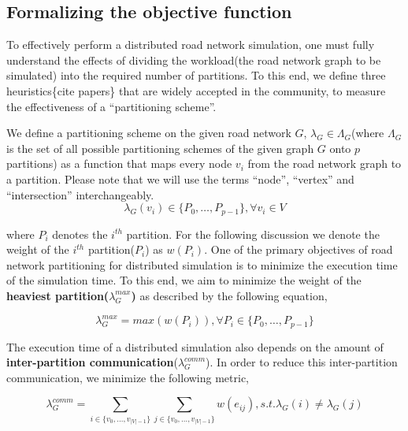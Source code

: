 \subsection{Formalizing the objective function}
\label{sec:form-obje-func}

To effectively perform a distributed road network simulation, one must fully understand the effects of dividing the workload(the road network graph to be simulated) into the required number of partitions. To this end, we define three heuristics\{cite papers\} that are widely accepted in the community, to measure the effectiveness of a ``partitioning scheme''. 

We define a partitioning scheme on the given road network $G$, $\lambda_G \in \Lambda_G$(where $\Lambda_G$ is the set of all possible partitioning schemes of the given graph $G$ onto $p$ partitions) as a function that maps every node $v_i$ from the road network graph to a partition. Please note that we will use the terms ``node'', ``vertex'' and ``intersection'' interchangeably.
\begin{equation}
\label{eq:part-sche}
\lambda_G(v_i) \in \{P_0,\dots,P_{p-1}\}, \forall v_i \in V
\end{equation}

\noindent where $P_i$ denotes the $i^{th}$ partition. For the following discussion we denote the weight of the $i^{th}$ partition($P_i$) as $w(P_i)$. One of the primary objectives of road network partitioning for distributed simulation is to minimize the execution time of the simulation time. To this end, we aim to minimize the weight of the \textbf{heaviest partition($\lambda_G^{max}$)} as described by the following equation,

\begin{equation}
\label{eq:metric1}
\lambda_G^{max} = max(w(P_i)), \forall P_i \in \{P_0,\dots,P_{p-1}\}
\end{equation}

\noindent The execution time of a distributed simulation also depends on the amount of \textbf{inter-partition communication}($\lambda_G^{comm}$). In order to reduce this inter-partition communication, we minimize the following metric,

\begin{equation}
\label{eq:metric2}
\lambda_G^{comm} = \sum\limits_{i \in \{v_0,\dots,v_{|V|-1}\}}{\sum\limits_{j \in \{v_0,\dots,v_{|V|-1}\}}{w(e_{ij})}} , s.t. \lambda_G(i) \neq \lambda_G(j)
\end{equation}

